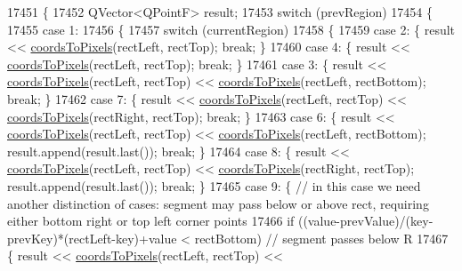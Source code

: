 \begin{DoxyCode}
17451 \{
17452   QVector<QPointF> result;
17453   \textcolor{keywordflow}{switch} (prevRegion)
17454   \{
17455     \textcolor{keywordflow}{case} 1:
17456     \{
17457       \textcolor{keywordflow}{switch} (currentRegion)
17458       \{
17459         \textcolor{keywordflow}{case} 2: \{ result << \hyperlink{class_q_c_p_abstract_plottable_ade710a776104b14c1c835168ce1bfc5c}{coordsToPixels}(rectLeft, rectTop); \textcolor{keywordflow}{break}; \}
17460         \textcolor{keywordflow}{case} 4: \{ result << \hyperlink{class_q_c_p_abstract_plottable_ade710a776104b14c1c835168ce1bfc5c}{coordsToPixels}(rectLeft, rectTop); \textcolor{keywordflow}{break}; \}
17461         \textcolor{keywordflow}{case} 3: \{ result << \hyperlink{class_q_c_p_abstract_plottable_ade710a776104b14c1c835168ce1bfc5c}{coordsToPixels}(rectLeft, rectTop) << 
      \hyperlink{class_q_c_p_abstract_plottable_ade710a776104b14c1c835168ce1bfc5c}{coordsToPixels}(rectLeft, rectBottom); \textcolor{keywordflow}{break}; \}
17462         \textcolor{keywordflow}{case} 7: \{ result << \hyperlink{class_q_c_p_abstract_plottable_ade710a776104b14c1c835168ce1bfc5c}{coordsToPixels}(rectLeft, rectTop) << 
      \hyperlink{class_q_c_p_abstract_plottable_ade710a776104b14c1c835168ce1bfc5c}{coordsToPixels}(rectRight, rectTop); \textcolor{keywordflow}{break}; \}
17463         \textcolor{keywordflow}{case} 6: \{ result << \hyperlink{class_q_c_p_abstract_plottable_ade710a776104b14c1c835168ce1bfc5c}{coordsToPixels}(rectLeft, rectTop) << 
      \hyperlink{class_q_c_p_abstract_plottable_ade710a776104b14c1c835168ce1bfc5c}{coordsToPixels}(rectLeft, rectBottom); result.append(result.last()); \textcolor{keywordflow}{break}; \}
17464         \textcolor{keywordflow}{case} 8: \{ result << \hyperlink{class_q_c_p_abstract_plottable_ade710a776104b14c1c835168ce1bfc5c}{coordsToPixels}(rectLeft, rectTop) << 
      \hyperlink{class_q_c_p_abstract_plottable_ade710a776104b14c1c835168ce1bfc5c}{coordsToPixels}(rectRight, rectTop); result.append(result.last()); \textcolor{keywordflow}{break}; \}
17465         \textcolor{keywordflow}{case} 9: \{ \textcolor{comment}{// in this case we need another distinction of cases: segment may pass below or above
       rect, requiring either bottom right or top left corner points}
17466           \textcolor{keywordflow}{if} ((value-prevValue)/(key-prevKey)*(rectLeft-key)+value < rectBottom) \textcolor{comment}{// segment passes below R}
17467           \{ result << \hyperlink{class_q_c_p_abstract_plottable_ade710a776104b14c1c835168ce1bfc5c}{coordsToPixels}(rectLeft, rectTop) << 

\end{DoxyCode}
